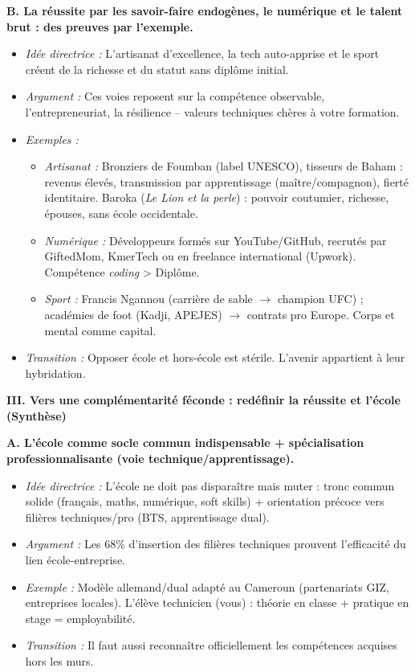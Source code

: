 \documentclass[11pt]{article}
\begin{document}
\begin{exoresolu}
\noindent\textbf{B. La réussite par les savoir-faire endogènes, le numérique et le talent brut : des preuves par l'exemple.}
\begin{itemize}
    \item \textit{Idée directrice :} L'artisanat d'excellence, la tech auto-apprise et le sport créent de la richesse et du statut sans diplôme initial.
    \item \textit{Argument :} Ces voies reposent sur la compétence observable, l'entrepreneuriat, la résilience -- valeurs techniques chères à votre formation.
    \item \textit{Exemples :}
    \begin{itemize}
        \item \textit{Artisanat :} Bronziers de Foumban (label UNESCO), tisseurs de Baham : revenus élevés, transmission par apprentissage (maître/compagnon), fierté identitaire. Baroka (\emph{Le Lion et la perle}) : pouvoir coutumier, richesse, épouses, sans école occidentale.
        \item \textit{Numérique :} Développeurs formés sur YouTube/GitHub, recrutés par GiftedMom, KmerTech ou en freelance international (Upwork). Compétence \emph{coding} > Diplôme.
        \item \textit{Sport :} Francis Ngannou (carrière de sable $\rightarrow$ champion UFC) ; académies de foot (Kadji, APEJES) $\rightarrow$ contrats pro Europe. Corps et mental comme capital.
    \end{itemize}
    \item \textit{Transition :} Opposer école et hors-école est stérile. L'avenir appartient à leur hybridation.
\end{itemize}

\noindent\textbf{III. Vers une complémentarité féconde : redéfinir la réussite et l'école (Synthèse)}

\noindent\textbf{A. L'école comme socle commun indispensable + spécialisation professionnalisante (voie technique/apprentissage).}
\begin{itemize}
    \item \textit{Idée directrice :} L'école ne doit pas disparaître mais muter : tronc commun solide (français, maths, numérique, soft skills) + orientation précoce vers filières techniques/pro (BTS, apprentissage dual).
    \item \textit{Argument :} Les 68\% d'insertion des filières techniques prouvent l'efficacité du lien école-entreprise.
    \item \textit{Exemple :} Modèle allemand/dual adapté au Cameroun (partenariats GIZ, entreprises locales). L'élève technicien (vous) : théorie en classe + pratique en stage = employabilité.
    \item \textit{Transition :} Il faut aussi reconnaître officiellement les compétences acquises hors les murs.
\end{itemize}


\end{exoresolu}
\end{document}
